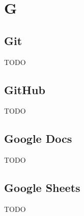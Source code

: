\section{G}

\vspace{2em}
\subsection*{Git}
TODO

\vspace{2em}
\subsection*{GitHub}
TODO

\vspace{2em}
\subsection*{Google Docs}
TODO

\vspace{2em}
\subsection*{Google Sheets}
TODO